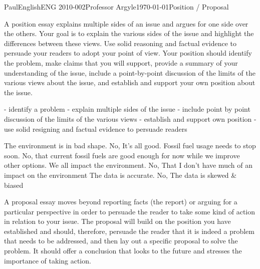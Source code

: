 \documentclass[12pt,letterpaper]{article}
\begin{document}
\begin{mla}{Paul}{English}{ENG 2010-002}{Professor Argyle}{\today}{Position / Proposal}

A position essay explains multiple sides of an issue and argues for one side over the others.  Your goal is to explain the various sides of the issue and highlight the differences between these views.  Use solid reasoning and factual evidence to persuade your readers to adopt your point of view.  Your position should identify the problem, make claims that you will support, provide a summary of your understanding of the issue, include a point-by-point discussion of the limits of the various views about the issue, and establish and support your own position about the issue.

- identify a problem
- explain multiple sides of the issue
- include point by point discussion of the limits of the various views
- establish and support own position
- use solid resigning and factual evidence to persuade readers

The environment is in bad shape. No, It's all good.
Fossil fuel usage needs to stop soon. No, that current fossil fuels are good enough for now while we improve other options.
We all impact the environment. No, That I don't have much of an impact on the environment
The data is accurate. No, The data is skewed \& biased


A proposal essay moves beyond reporting facts (the report) or arguing for a particular perspective in order to persuade the reader to take some kind of action in relation to your issue. The proposal will build on the position you have established and should, therefore, persuade the reader that it is indeed a problem that needs to be addressed, and then lay out a specific proposal to solve the problem.  It should offer a conclusion that looks to the future and stresses the importance of taking action.


\end{mla}
\end{document}
